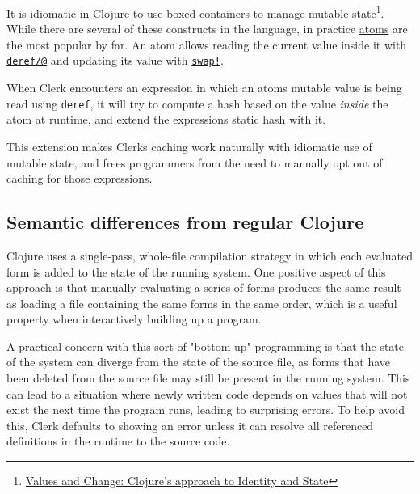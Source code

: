 \documentclass[sigconf,screen]{acmart}
\newcommand{\passthrough}[1]{#1}
\begin{document}
It is idiomatic in Clojure to use boxed containers to manage mutable state\footnote{\href{https://clojure.org/about/state}{Values and Change: Clojure's approach to Identity and State}}. While there are several of these constructs in the language, in practice \href{https://clojure.org/reference/atoms}{atoms} are the most popular by far. An atom allows reading the current value inside it with \href{https://clojure.github.io/clojure/clojure.core-api.html\#clojure.core/deref}{\passthrough{\lstinline!deref/@!}} and updating it\textquotesingle s value with \href{https://clojure.github.io/clojure/clojure.core-api.html\#clojure.core/swap!}{\passthrough{\lstinline"swap!"}}.

When Clerk encounters an expression in which an atom\textquotesingle s mutable value is being read using \passthrough{\lstinline!deref!}, it will try to compute a hash based on the value \emph{inside} the atom  at runtime, and extend the expression\textquotesingle s static hash with it.

This extension makes Clerk\textquotesingle s caching work naturally with idiomatic use of mutable state, and frees programmers from the need to manually opt out of caching for those expressions.

\hypertarget{semantic-differences-from-regular-clojure}{%
\subsection{Semantic differences from regular Clojure}\label{semantic-differences-from-regular-clojure}}

Clojure uses a single-pass, whole-file compilation strategy in which each evaluated form is added to the state of the running system. One positive aspect of this approach is that manually evaluating a series of forms produces the same result as loading a file containing the same forms in the same order, which is a useful property when interactively building up a program.

A practical concern with this sort of "bottom-up" programming is that the state of the system can diverge from the state of the source file, as forms that have been deleted from the source file may still be present in the running system. This can lead to a situation where newly written code depends on values that will not exist the next time the program runs, leading to surprising errors. To help avoid this, Clerk defaults to showing an error unless it can resolve all referenced definitions in the runtime to the source code.
\end{document}
